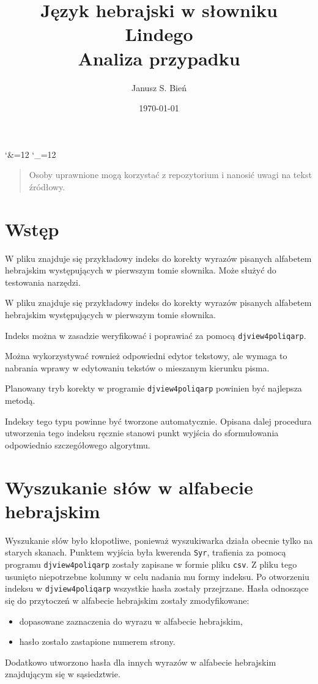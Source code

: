 \documentclass[12]{mwart}
\title{Język hebrajski w słowniku Lindego\\Analiza przypadku}
\author{Janusz S. Bień}
\date{\today}
\begin{document}
\maketitle

\catcode`\&=12
\catcode`\_=12

\begin{quote}
  Osoby uprawnione mogą korzystać z repozytorium
   i
  nanosić uwagi na tekst źródłowy.
\end{quote}

\section{Wstęp}
\label{sec:wstp}

W pliku  znajduje się przykładowy indeks do korekty
wyrazów pisanych alfabetem hebrajskim występujących w pierwszym tomie
słownika. Może służyć do testowania narzędzi.

W pliku  znajduje się przykładowy indeks do korekty
wyrazów pisanych alfabetem hebrajskim występujących w pierwszym tomie
słownika. 

Indeks można w zasadzie weryfikować i poprawiać za pomocą
\texttt{djview4poliqarp}.

Można wykorzystywać rownież odpowiedni edytor tekstowy, ale wymaga to
nabrania wprawy w edytowaniu tekstów o mieszanym kierunku pisma.

Planowany tryb korekty w programie \texttt{djview4poliqarp}
powinien być najlepsza metodą.

Indeksy tego typu powinne być tworzone automatycznie. Opisana dalej
procedura utworzenia tego indeksu ręcznie stanowi punkt wyjścia do
sformułowania odpowiednio szczegółowego algorytmu.

\section{Wyszukanie słów w alfabecie hebrajskim}
\label{sec:wyszukanie-sow-w}

Wyszukanie słów było kłopotliwe, ponieważ wyszukiwarka działa obecnie
tylko na starych skanach. Punktem wyjścia była kwerenda \texttt{Syr},
trafienia za pomocą programu \texttt{djview4poliqarp} zostały zapisane
w formie pliku \texttt{csv}. Z pliku tego usunięto niepotrzebne
kolumny w celu nadania mu formy indeksu. Po otworzeniu indeksu w
\texttt{djview4poliqarp} wszystkie hasła zostały przejrzane. Hasła
odnoszące się do przytoczeń w alfabecie hebrajskim zostały
zmodyfikowane:
\begin{itemize}
\item dopasowane zaznaczenia do wyrazu w alfabecie hebrajskim,
\item hasło zostało zastapione numerem strony.
\end{itemize}
Dodatkowo utworzono hasła dla innych wyrazów w alfabecie hebrajskim
znajdującym się w sąsiedztwie.
\end{document}
